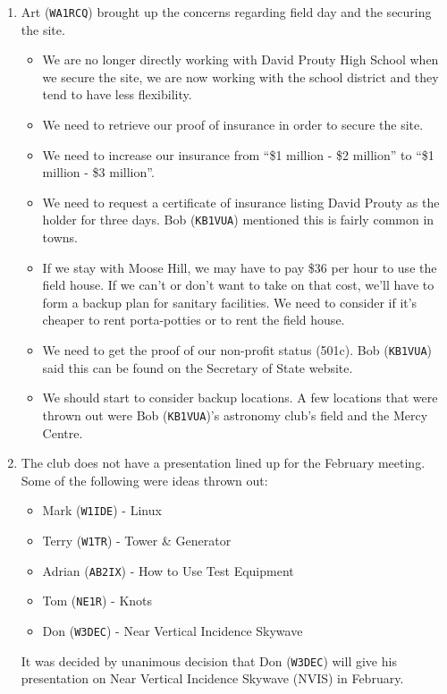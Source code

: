 \documentclass[10pt,letterpaper]{article}
\begin{document}
\begin{enumerate}
\item Art (\texttt{WA1RCQ}) brought up the concerns regarding field day and the securing the site.
\begin{itemize}
\item We are no longer directly working with David Prouty High School when we secure the site, we are now working with the school district and they tend to have less flexibility.
\item We need to retrieve our proof of insurance in order to secure the site.
\item We need to increase our insurance from ``\$1 million - \$2 million'' to ``\$1 million - \$3 million''.
\item We need to request a certificate of insurance listing David Prouty as the holder for three days. Bob (\texttt{KB1VUA}) mentioned this is fairly common in towns.
\item If we stay with Moose Hill, we may have to pay \$36 per hour to use the field house. If we can't or don't want to take on that cost, we'll have to form a backup plan for sanitary facilities. We need to consider if it's cheaper to rent porta-potties or to rent the field house.
\item We need to get the proof of our non-profit status (501c). Bob (\texttt{KB1VUA}) said this can be found on the Secretary of State website.
\item We should start to consider backup locations. A few locations that were thrown out were Bob (\texttt{KB1VUA})'s astronomy club's field and the Mercy Centre.
\end{itemize}

\item The club does not have a presentation lined up for the February meeting. Some of the following were ideas thrown out:
\begin{itemize}
\item Mark (\texttt{W1IDE}) - Linux
\item Terry (\texttt{W1TR}) - Tower \& Generator
\item Adrian (\texttt{AB2IX}) - How to Use Test Equipment
\item Tom (\texttt{NE1R}) - Knots
\item Don (\texttt{W3DEC}) - Near Vertical Incidence Skywave
\end{itemize}
It was decided by unanimous decision that Don (\texttt{W3DEC}) will give his presentation on Near Vertical Incidence Skywave (NVIS) in February.


\end{enumerate}
\end{document}
